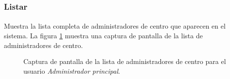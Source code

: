 \subsubsection{Listar}

  \paragraph{}Muestra la lista completa de administradores de centro que
  aparecen en el sistema. La figura
  \ref{capturaPantallaListaAdministradoresCentroAdminPrincipal} muestra una
  captura de pantalla de la lista de administradores de centro.

  \begin{figure}[!ht]
    \begin{center}
      \caption{Captura de pantalla de la lista de administradores de centro para el usuario \textit{Administrador principal}.}
      \label{capturaPantallaListaAdministradoresCentroAdminPrincipal}
    \end{center}
  \end{figure}
